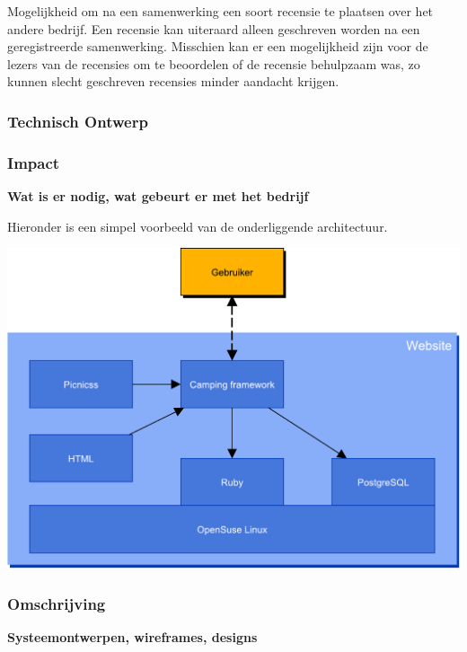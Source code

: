 Mogelijkheid om na een samenwerking een soort recensie te plaatsen
over het andere bedrijf. Een recensie kan uiteraard alleen geschreven
worden na een geregistreerde samenwerking. Misschien kan er een
mogelijkheid zijn voor de lezers van de recensies om te beoordelen of
de recensie behulpzaam was, zo kunnen slecht geschreven recensies
minder aandacht krijgen.

\subsubsection{Technisch Ontwerp}





\subsubsection{Impact}
{\bf Wat is er nodig, wat gebeurt er met het bedrijf}

Hieronder is een simpel voorbeeld van de onderliggende architectuur.

\includegraphics[width=\textwidth]{img/websiteArchitecture}

\subsubsection{Omschrijving}

{\bf Systeemontwerpen, wireframes, designs}
